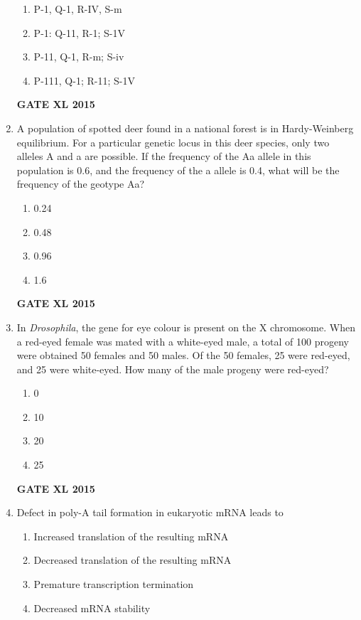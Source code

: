 \documentclass[journal,12pt,onecolumn]{IEEEtran}
\begin{document}
\begin{enumerate}
\begin{minipage}{0.5\textwidth}
\begin{flushleft}
	\end{flushleft}
	\end{minipage}
    \begin{enumerate}
		\item P-1, Q-1, R-IV, S-m
	    \item P-1: Q-11, R-1; S-1V
	    \item P-11, Q-1, R-m; S-iv
            \item P-111, Q-1; R-11; S-1V
    \end{enumerate}
\hfill{\textbf{GATE XL 2015}}
\item A population of spotted deer found in a national forest is in Hardy-Weinberg equilibrium. For a particular genetic locus in this deer species, only two alleles A and a are possible. If the frequency of the Aa allele in this population is 0.6, and the frequency of the a allele is 0.4, what will be the frequency of the geotype Aa?
    \begin{enumerate}
            \item 0.24
	    \item 0.48
	    \item 0.96
            \item 1.6
    \end{enumerate}
\hfill{\textbf{GATE XL 2015}}
\item In \textit{Drosophila}, the gene for eye colour is present on the X chromosome. When a red-eyed female was mated with a white-eyed male, a total of 100 progeny were obtained 50 females and 50 males. Of the 50 females, 25 were red-eyed, and 25 were white-eyed. How many of the male progeny were red-eyed?
    \begin{enumerate}
            \item 0
	    \item 10
	    \item 20
            \item 25
    \end{enumerate}
\hfill{\textbf{GATE XL 2015}}
\item  Defect in poly-A tail formation in eukaryotic mRNA leads to
    \begin{enumerate}
            \item  Increased translation of the resulting mRNA
	    \item Decreased translation of the resulting mRNA
	    \item Premature transcription termination
            \item  Decreased mRNA stability
    \end{enumerate}

\end{enumerate}
\end{document}
